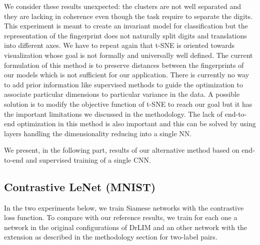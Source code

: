 \documentclass[a4paper,12pt]{report}
\begin{document}
We consider these results unexpected: the clusters are not well separated and they are lacking in coherence even though the task require to separate the digits.
This experiment is meant to create an invariant model for classification but the representation of the fingerprint does not naturally split digits and translations into different axes.
We have to repeat again that t-SNE is oriented towards visualization whose goal is not formally and universally well defined.
The current formulation of this method is to preserve distances between the fingerprints of our models which is not sufficient for our application.
There is currently no way to add prior information like supervised methods to guide the optimization to associate particular dimensions to particular variance in the data.
A possible solution is to modify the objective function of t-SNE to reach our goal but it has the important limitations we discussed in the methodology.
The lack of end-to-end optimization in this method is also important and this can be solved by using layers handling the dimensionality reducing into a single NN.

We present, in the following part, results of our alternative method based on end-to-end and supervised training of a single CNN.

\subsection{Contrastive LeNet (MNIST)}

In the two experiments below, we train Siamese networks with the contrastive loss function.
To compare with our reference results, we train for each one a network in the original configurations of DrLIM and an other network with the extension as described in the methodology section for two-label pairs.
\end{document}
